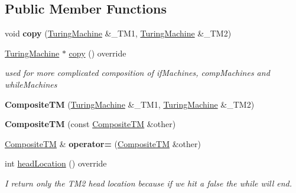 \subsection*{Public Member Functions}
\begin{DoxyCompactItemize}
\item 
\mbox{\label{class_composite_t_m_a63fe59b2463b5e7e739a8674e1c9b73d}} 
void {\bfseries copy} (\mbox{\hyperlink{class_turing_machine}{Turing\+Machine}} \&\+\_\+\+T\+M1, \mbox{\hyperlink{class_turing_machine}{Turing\+Machine}} \&\+\_\+\+T\+M2)
\item 
\mbox{\label{class_composite_t_m_a1927c899ad8e2cc52f4e778f3537173c}} 
\mbox{\hyperlink{class_turing_machine}{Turing\+Machine}} $\ast$ \mbox{\hyperlink{class_composite_t_m_a1927c899ad8e2cc52f4e778f3537173c}{copy}} () override
\begin{DoxyCompactList}\small\item\em used for more complicated composition of if\+Machines, comp\+Machines and while\+Machines \end{DoxyCompactList}\item 
\mbox{\label{class_composite_t_m_a780924be1761258069fde6f33d3ee896}} 
{\bfseries Composite\+TM} (\mbox{\hyperlink{class_turing_machine}{Turing\+Machine}} \&\+\_\+\+T\+M1, \mbox{\hyperlink{class_turing_machine}{Turing\+Machine}} \&\+\_\+\+T\+M2)
\item 
\mbox{\label{class_composite_t_m_a6f63e2eee33c237cdeb89c837d9dc92e}} 
{\bfseries Composite\+TM} (const \mbox{\hyperlink{class_composite_t_m}{Composite\+TM}} \&other)
\item 
\mbox{\label{class_composite_t_m_a4c5e4b9e5c25b0673043adf2cffbf3ec}} 
\mbox{\hyperlink{class_composite_t_m}{Composite\+TM}} \& {\bfseries operator=} (\mbox{\hyperlink{class_composite_t_m}{Composite\+TM}} \&other)
\item 
\mbox{\label{class_composite_t_m_a450454441e373fc3cea1621c0fce3851}} 
int \mbox{\hyperlink{class_composite_t_m_a450454441e373fc3cea1621c0fce3851}{head\+Location}} () override
\begin{DoxyCompactList}\small\item\em I return only the T\+M2 head location because if we hit a false the while will end. \end{DoxyCompactList}\item 

\end{DoxyCompactItemize}
